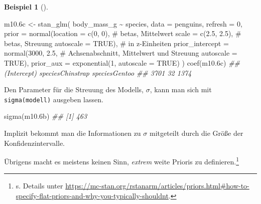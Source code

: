 \documentclass[
  ngerman,
  letterpaper,
  twoside,
  open=any]{scrbook}
\newenvironment{Shaded}{\begin{snugshade}}{\end{snugshade}}
\newcommand{\AttributeTok}[1]{\textcolor[rgb]{0.40,0.45,0.13}{#1}}
\newcommand{\CommentTok}[1]{\textcolor[rgb]{0.37,0.37,0.37}{#1}}
\newcommand{\ConstantTok}[1]{\textcolor[rgb]{0.56,0.35,0.01}{#1}}
\newcommand{\DecValTok}[1]{\textcolor[rgb]{0.68,0.00,0.00}{#1}}
\newcommand{\DocumentationTok}[1]{\textcolor[rgb]{0.37,0.37,0.37}{\textit{#1}}}
\newcommand{\FloatTok}[1]{\textcolor[rgb]{0.68,0.00,0.00}{#1}}
\newcommand{\FunctionTok}[1]{\textcolor[rgb]{0.28,0.35,0.67}{#1}}
\newcommand{\NormalTok}[1]{\textcolor[rgb]{0.00,0.23,0.31}{#1}}
\newcommand{\OtherTok}[1]{\textcolor[rgb]{0.00,0.23,0.31}{#1}}
\newcommand{\SpecialCharTok}[1]{\textcolor[rgb]{0.37,0.37,0.37}{#1}}
\theoremstyle{definition}
\newtheorem{example}{Beispiel}[chapter]
\theoremstyle{plain}
\theoremstyle{definition}
\theoremstyle{definition}
\theoremstyle{remark}
\begin{document}
\begin{example}[]
\begin{Shaded}
\begin{Highlighting}[]
\NormalTok{m10}\FloatTok{.6}\NormalTok{c }\OtherTok{\textless{}{-}} \FunctionTok{stan\_glm}\NormalTok{(}
\NormalTok{  body\_mass\_g }\SpecialCharTok{\textasciitilde{}}\NormalTok{ species, }
  \AttributeTok{data =}\NormalTok{ penguins, }
  \AttributeTok{refresh =} \DecValTok{0}\NormalTok{,}
  \AttributeTok{prior =} \FunctionTok{normal}\NormalTok{(}\AttributeTok{location =} \FunctionTok{c}\NormalTok{(}\DecValTok{0}\NormalTok{, }\DecValTok{0}\NormalTok{),  }\CommentTok{\# betas, Mittelwert}
                 \AttributeTok{scale =} \FunctionTok{c}\NormalTok{(}\FloatTok{2.5}\NormalTok{, }\FloatTok{2.5}\NormalTok{),  }\CommentTok{\# betas, Streuung}
                 \AttributeTok{autoscale =} \ConstantTok{TRUE}\NormalTok{),  }\CommentTok{\# in z{-}Einheiten}
  \AttributeTok{prior\_intercept =} \FunctionTok{normal}\NormalTok{(}\DecValTok{3000}\NormalTok{, }\FloatTok{2.5}\NormalTok{,   }\CommentTok{\# Achsenabschnitt, Mittelwert und Streuung}
                           \AttributeTok{autoscale =} \ConstantTok{TRUE}\NormalTok{), }
  \AttributeTok{prior\_aux =} \FunctionTok{exponential}\NormalTok{(}\DecValTok{1}\NormalTok{, }\AttributeTok{autoscale =} \ConstantTok{TRUE}\NormalTok{)}
\NormalTok{)}
\FunctionTok{coef}\NormalTok{(m10}\FloatTok{.6}\NormalTok{c)}
\DocumentationTok{\#\#      (Intercept) speciesChinstrap    speciesGentoo }
\DocumentationTok{\#\#             3701               32             1374}
\end{Highlighting}
\end{Shaded}

Den Parameter für die Streuung des Modells, \(\sigma\), kann man sich
mit \texttt{sigma(modell)} ausgeben lassen.

\begin{Shaded}
\begin{Highlighting}[]
\FunctionTok{sigma}\NormalTok{(m10}\FloatTok{.6}\NormalTok{b)}
\DocumentationTok{\#\# [1] 463}
\end{Highlighting}
\end{Shaded}

Implizit bekommt man die Informationen zu \(\sigma\) mitgeteilt durch
die Größe der Konfidenzintervalle.

Übrigens macht es meistens keinen Sinn, \emph{extrem} weite Prioris zu
definieren.\footnote{s. Details unter
  \url{https://mc-stan.org/rstanarm/articles/priors.html\#how-to-specify-flat-priors-and-why-you-typically-shouldnt}.}


\end{example}
\end{document}
